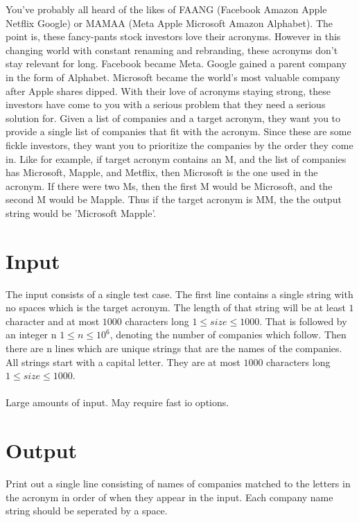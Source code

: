 
You've probably all heard of the likes of FAANG (Facebook Amazon Apple Netflix Google) or MAMAA (Meta Apple Microsoft Amazon Alphabet). The point is, these fancy-pants stock investors love their acronyms. However in this changing world with constant renaming and rebranding, these acronyms don't stay relevant for long. Facebook became Meta. Google gained a parent company in the form of Alphabet. Microsoft became the world's most valuable company after Apple shares dipped. With their love of acronyms staying strong, these investors have come to you with a serious problem that they need a serious solution for. Given a list of companies and a target acronym, they want you to provide a single list of companies that fit with the acronym. Since these are some fickle investors, they want you to prioritize the companies by the order they come in. Like for example, if target acronym contains an M, and the list of companies has Microsoft, Mapple, and Metflix, then Microsoft is the one used in the acronym. If there were two Ms, then the first M would be Microsoft, and the second M would be Mapple. Thus if the target acronym is MM, the the output string would be 'Microsoft Mapple'.

\section*{Input}

The input consists of a single test case. The first line contains a single string with no spaces which is the target acronym. The length of that string will be at least $1$ character and at most $1000$ characters long $1 \le size \le 1000 $. That is followed by an integer n $1 \le n \le 10^{6}$, denoting the number of companies which follow. Then there are n lines which are unique strings that are the names of the companies. All strings start with a capital letter. They are at most $1000$ characters long $1 \le size \le 1000 $.
\\ \\
Large amounts of input. May require fast io options.

\section*{Output}

Print out a single line consisting of names of companies matched to the letters in the acronym in order of when they appear in the input. Each company name string should be seperated by a space.
